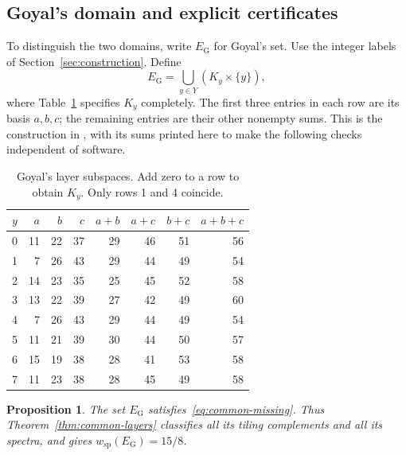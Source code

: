 \documentclass[11pt]{article}
\numberwithin{equation}{section}
\newtheorem{proposition}[theorem]{Proposition}
\theoremstyle{definition}
\theoremstyle{remark}\newtheorem{remark}[theorem]{Remark}
\newcommand{\wsp}{w_{\mathrm{sp}}}
\begin{document}
\subsection{Goyal's domain and explicit certificates}

To distinguish the two domains, write $E_{\mathrm G}$ for Goyal's set.
Use the integer labels of Section~\ref{sec:construction}. Define
\begin{equation}\label{eq:goyal-domain}
 E_{\mathrm G}=\bigcup_{y\in Y}(K_y\times\{y\}),
\end{equation}
where Table~\ref{tab:goyal-spaces} specifies $K_y$ completely.
The first three entries in each row are its basis $a,b,c$; the remaining
entries are their other nonempty sums. This is the construction in
\cite[Table~1]{Goyal}, with its sums printed here to make the following
checks independent of software.

\begin{table}[htbp]
\centering
\begin{tabular}{c|rrr|rrr|r}
\toprule
$y$&$a$&$b$&$c$&$a+b$&$a+c$&$b+c$&$a+b+c$\\\midrule
0&11&22&37&29&46&51&56\\
1&7&26&43&29&44&49&54\\
2&14&23&35&25&45&52&58\\
3&13&22&39&27&42&49&60\\
4&7&26&43&29&44&49&54\\
5&11&21&39&30&44&50&57\\
6&15&19&38&28&41&53&58\\
7&11&23&38&28&45&49&58\\\bottomrule
\end{tabular}
\caption{Goyal's layer subspaces. Add zero to a row to obtain $K_y$.
Only rows 1 and 4 coincide.}\label{tab:goyal-spaces}
\end{table}

\begin{proposition}\label{prop:goyal}
The set $E_{\mathrm G}$ satisfies~\eqref{eq:common-missing}. Thus
Theorem~\ref{thm:common-layers} classifies all its tiling complements
and all its spectra, and gives $\wsp(E_{\mathrm G})=15/8$.
\end{proposition}
\end{document}
